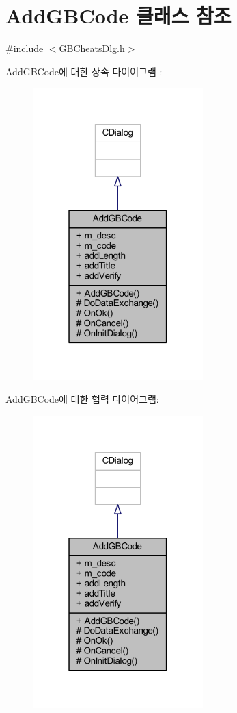 \hypertarget{class_add_g_b_code}{}\section{Add\+G\+B\+Code 클래스 참조}
\label{class_add_g_b_code}


{\ttfamily \#include $<$G\+B\+Cheats\+Dlg.\+h$>$}



Add\+G\+B\+Code에 대한 상속 다이어그램 \+: \nopagebreak
\begin{figure}[H]
\begin{center}
\leavevmode
\includegraphics[width=187pt]{class_add_g_b_code__inherit__graph}
\end{center}
\end{figure}


Add\+G\+B\+Code에 대한 협력 다이어그램\+:\nopagebreak
\begin{figure}[H]
\begin{center}
\leavevmode
\includegraphics[width=187pt]{class_add_g_b_code__coll__graph}
\end{center}
\end{figure}
